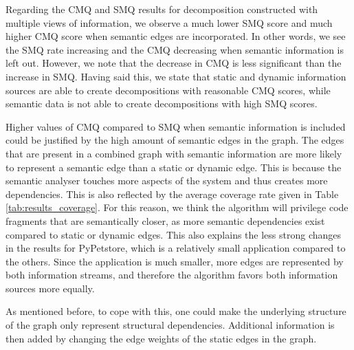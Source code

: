 Regarding the CMQ and SMQ results for decomposition constructed with multiple views of information, we observe a much lower SMQ score and much higher CMQ score when semantic edges are incorporated. In other words, we see the SMQ rate increasing and the CMQ decreasing when semantic information is left out. However, we note that the decrease in CMQ is less significant than the increase in SMQ. Having said this, we state that static and dynamic information sources are able to create decompositions with reasonable CMQ scores, while semantic data is not able to create decompositions with high SMQ scores. \par

Higher values of CMQ compared to SMQ when semantic information is included could be justified by the high amount of semantic edges in the graph. The edges that are present in a combined graph with semantic information are more likely to represent a semantic edge than a static or dynamic edge. This is because the semantic analyser touches more aspects of the system and thus creates more dependencies. This is also reflected by the average coverage rate given in Table \ref{tab:results_coverage}. For this reason, we think the algorithm will privilege code fragments that are semantically closer, as more semantic dependencies exist compared to static or dynamic edges. This also explains the less strong changes in the results for PyPetstore, which is a relatively small application compared to the others. Since the application is much smaller, more edges are represented by both information streams, and therefore the algorithm favors both information sources more equally. \par

As mentioned before, to cope with this, one could make the underlying structure of the graph only represent structural dependencies. Additional information is then added by changing the edge weights of the static edges in the graph.

